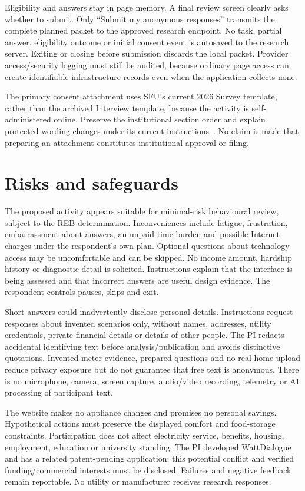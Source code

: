 \documentclass[11pt,letterpaper]{article}
\begin{document}
Eligibility and answers stay in page memory. A final review screen clearly asks whether to submit. Only ``Submit my anonymous responses'' transmits the complete planned packet to the approved research endpoint. No task, partial answer, eligibility outcome or initial consent event is autosaved to the research server. Exiting or closing before submission discards the local packet. Provider access/security logging must still be audited, because ordinary page access can create identifiable infrastructure records even when the application collects none.

The primary consent attachment uses SFU's current 2026 Survey template, rather than the archived Interview template, because the activity is self-administered online. Preserve the institutional section order and explain protected-wording changes under its current instructions~\cite{sfu-consent}. No claim is made that preparing an attachment constitutes institutional approval or filing.

\section{Risks and safeguards}
The proposed activity appears suitable for minimal-risk behavioural review, subject to the REB determination. Inconveniences include fatigue, frustration, embarrassment about answers, an unpaid time burden and possible Internet charges under the respondent's own plan. Optional questions about technology access may be uncomfortable and can be skipped. No income amount, hardship history or diagnostic detail is solicited. Instructions explain that the interface is being assessed and that incorrect answers are useful design evidence. The respondent controls pauses, skips and exit.

Short answers could inadvertently disclose personal details. Instructions request responses about invented scenarios only, without names, addresses, utility credentials, private financial details or details of other people. The PI redacts accidental identifying text before analysis/publication and avoids distinctive quotations. Invented meter evidence, prepared questions and no real-home upload reduce privacy exposure but do not guarantee that free text is anonymous. There is no microphone, camera, screen capture, audio/video recording, telemetry or AI processing of participant text.

The website makes no appliance changes and promises no personal savings. Hypothetical actions must preserve the displayed comfort and food-storage constraints. Participation does not affect electricity service, benefits, housing, employment, education or university standing. The PI developed WattDialogue and has a related patent-pending application; this potential conflict and verified funding/commercial interests must be disclosed. Failures and negative feedback remain reportable. No utility or manufacturer receives research responses.
\end{document}
